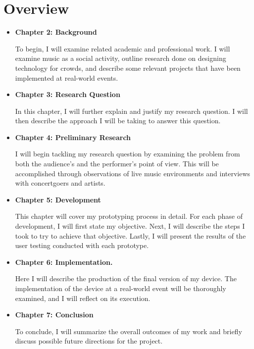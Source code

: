 \section{Overview}

\begin{itemize}
	\item \textbf{Chapter 2: Background}
	
	To begin, I will examine related academic and professional work. I will examine music as a social activity, outline research done on designing technology for crowds, and describe some relevant projects that have been implemented at real-world events.
	
	\item \textbf{Chapter 3: Research Question}
	
	In this chapter, I will further explain and justify my research question. I will then describe the approach I will be taking to answer this question.
	
	\item \textbf{Chapter 4: Preliminary Research}
	
	I will begin tackling my research question by examining the problem from both the audience's and the performer's point of view. This will be accomplished through observations of live music environments and interviews with concertgoers and artists.
	
	\item \textbf{Chapter 5: Development}
	
	This chapter will cover my prototyping process in detail. For each phase of development, I will first state my objective. Next, I will describe the steps I took to try to achieve that objective. Lastly, I will present the results of the user testing conducted with each prototype.
		
	\item \textbf{Chapter 6: Implementation.}
	
	Here I will describe the production of the final version of my device. The implementation of the device at a real-world event will be thoroughly examined, and I will reflect on its execution.
	
	\item \textbf{Chapter 7: Conclusion}
	
	To conclude, I will summarize the overall outcomes of my work and briefly discuss possible future directions for the project.
\end{itemize}